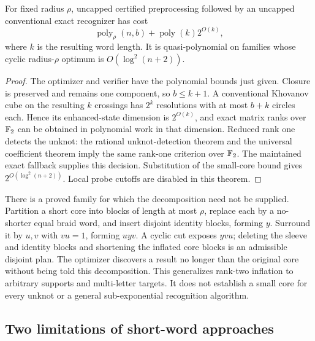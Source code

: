 \begin{proposition}
For fixed radius $\rho$, uncapped certified preprocessing followed by an
uncapped conventional exact recognizer has cost
\[
 \operatorname{poly}_{\rho}(n,b)+\operatorname{poly}(k)2^{O(k)},
\]
where $k$ is the resulting word length.  It is quasi-polynomial on families
whose cyclic radius-$\rho$ optimum is $O(\log^2(n+2))$.
\end{proposition}
\begin{proof}
The optimizer and verifier have the polynomial bounds just given.  Closure
is preserved and remains one component, so $b\le k+1$.  A conventional
Khovanov cube on the resulting $k$ crossings has $2^k$ resolutions with
at most $b+k$ circles each.  Hence its enhanced-state dimension is
$2^{O(k)}$, and exact matrix ranks over $\mathbb{F}_2$ can be obtained in polynomial
work in that dimension.  Reduced rank one detects the unknot: the rational
unknot-detection theorem and the universal coefficient theorem imply the
same rank-one criterion over $\mathbb{F}_2$.  The maintained exact fallback supplies
this decision.  Substitution of the small-core bound gives
$2^{O(\log^2(n+2))}$.  Local probe cutoffs are disabled in this theorem.
\end{proof}

There is a proved family for which the decomposition need not be supplied.
Partition a short core into blocks of length at most $\rho$, replace each
by a no-shorter equal braid word, and insert disjoint identity blocks,
forming $y$.  Surround it by $u,v$ with $vu=1$, forming $uyv$.
A cyclic cut exposes $yvu$; deleting the sleeve and identity blocks and
shortening the inflated core blocks is an admissible disjoint plan.
The optimizer discovers a result no longer than the original core without
being told this decomposition.  This generalizes rank-two inflation to
arbitrary supports and multi-letter targets.  It does not establish a small
core for every unknot or a general sub-exponential recognition algorithm.

\subsection{Two limitations of short-word approaches}

